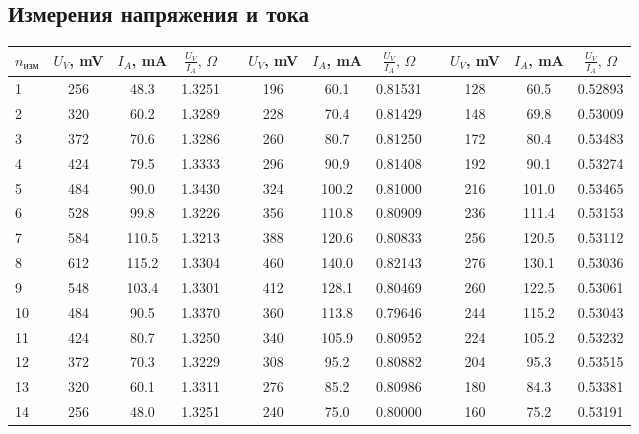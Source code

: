 \documentclass[12pt]{article}
\begin{document}
\begin{thebibliography}
\subsection*{Измерения напряжения и тока}
\label{sec: measurements}
\begin{table}[H]
    \begin{minipage}[c]{\textwidth}
    \centering
    \footnotesize
    \begin{tabular}{|m{0.51 cm}|c|c|c||c||c|c|c||c||c|c|c|}
        \hline
$n_\text{изм}$ & $U_V$, mV & $I_A$, mA & $\frac{U_V}{I_A},\,\Omega$ & & $U_V$, mV & $I_A$, mA & $\frac{U_V}{I_A},\,\Omega$ & & $U_V$, mV & $I_A$, mA & $\frac{U_V}{I_A},\,\Omega$\\ \hline
1      & 256   & 48.3  & 1.3251 & &196   & 60.1  & 0.81531 && 128   & 60.5  & 0.52893 \\
2      & 320   & 60.2  & 1.3289 & &228   & 70.4    & 0.81429 && 148   & 69.8  & 0.53009 \\
3      & 372   & 70.6   & 1.3286 & &260   & 80.7   & 0.81250 && 172   & 80.4  & 0.53483 \\
4      & 424   & 79.5  & 1.3333 & &296   & 90.9  & 0.81408 && 192   & 90.1  & 0.53274 \\
5      & 484   & 90.0  & 1.3430 & &324   & 100.2   & 0.81000 && 216   & 101.0   & 0.53465 \\
6      & 528   & 99.8  & 1.3226 & &356   & 110.8   & 0.80909 && 236   & 111.4   & 0.53153 \\
7      & 584   & 110.5 & 1.3213 & &388   & 120.6   & 0.80833 && 256   & 120.5 & 0.53112 \\
8      & 612   & 115.2   & 1.3304 & &460   & 140.0   & 0.82143 && 276   & 130.1 & 0.53036 \\
9      & 548   & 103.4   & 1.3301 & &412   & 128.1   & 0.80469 && 260   & 122.5 & 0.53061 \\
10     & 484   & 90.5  & 1.3370 & &360   & 113.8   & 0.79646 && 244   & 115.2   & 0.53043 \\
11     & 424   & 80.7    & 1.3250 & &340   & 105.9   & 0.80952 && 224   & 105.2 & 0.53232 \\
12     & 372   & 70.3  & 1.3229 & &308   & 95.2  & 0.80882 & &204   & 95.3  & 0.53515 \\
13     & 320   & 60.1  & 1.3311 & &276   & 85.2  & 0.80986 && 180   & 84.3  & 0.53381 \\
14     & 256   & 48.0  & 1.3251 & &240   & 75.0  & 0.80000 && 160   & 75.2  & 0.53191 \\\hline
        

\end{tabular}
\end{minipage}
\end{table}
\end{thebibliography}
\end{document}
